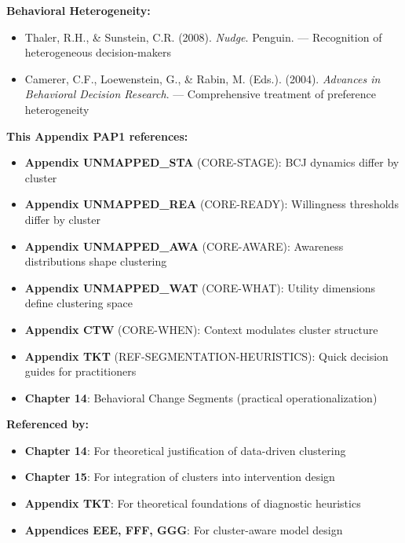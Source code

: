 \textbf{Behavioral Heterogeneity:}
\begin{itemize}
\item Thaler, R.H., \& Sunstein, C.R. (2008). \textit{Nudge}. Penguin.
  --- Recognition of heterogeneous decision-makers
\item Camerer, C.F., Loewenstein, G., \& Rabin, M. (Eds.). (2004).
  \textit{Advances in Behavioral Decision Research}. --- Comprehensive treatment
  of preference heterogeneity
\end{itemize}


\begin{tcolorbox}[colback=purple!5!white, colframe=purple!75!black,
    title=Cross-References]

\textbf{This Appendix PAP1 references:}
\begin{itemize}[nosep]
\item \textbf{Appendix UNMAPPED_STA} (CORE-STAGE): BCJ dynamics differ by cluster
\item \textbf{Appendix UNMAPPED_REA} (CORE-READY): Willingness thresholds differ by cluster
\item \textbf{Appendix UNMAPPED_AWA} (CORE-AWARE): Awareness distributions shape clustering
\item \textbf{Appendix UNMAPPED_WAT} (CORE-WHAT): Utility dimensions define clustering space
\item \textbf{Appendix CTW} (CORE-WHEN): Context modulates cluster structure
\item \textbf{Appendix TKT} (REF-SEGMENTATION-HEURISTICS): Quick decision guides for practitioners
\item \textbf{Chapter 14}: Behavioral Change Segments (practical operationalization)
\end{itemize}

\textbf{Referenced by:}
\begin{itemize}[nosep]
\item \textbf{Chapter 14}: For theoretical justification of data-driven clustering
\item \textbf{Chapter 15}: For integration of clusters into intervention design
\item \textbf{Appendix TKT}: For theoretical foundations of diagnostic heuristics
\item \textbf{Appendices EEE, FFF, GGG}: For cluster-aware model design
\end{itemize}

\end{tcolorbox}


